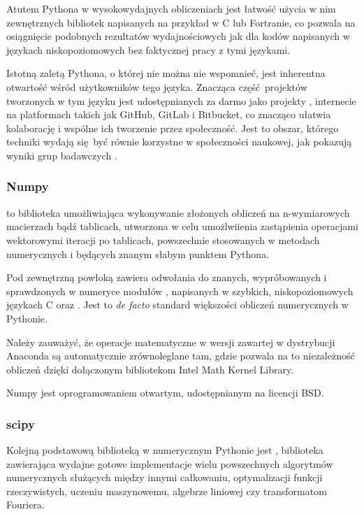     Atutem Pythona w wysokowydajnych obliczeniach jest łatwość użycia w
    nim zewnętrznych bibliotek napisanych na przykład w C lub Fortranie, co
    pozwala na osiągnięcie podobnych rezultatów wydajnościowych jak dla kodów
    napisanych w językach niskopoziomowych bez faktycznej pracy z tymi
    językami.

    Istotną zaletą Pythona, o której nie można nie wspomnieć, jest inherentna
    otwartość wśród użytkowników tego języka. Znacząca część projektów tworzonych w
    tym języku jest udostępnianych za darmo jako projekty ,
    internecie na platformach takich jak GitHub, GitLab i Bitbucket, co znacząco
    ułatwia kolaborację i wspólne ich tworzenie przez społeczność.  Jest to obszar,
    którego techniki wydają się być równie korzystne w społeczności naukowej, jak pokazują
    wyniki grup badawczych \cite{labarba}. %

    \subsubsection{Numpy}
    \cite{numpy} to biblioteka umożliwiająca wykonywanie złożonych obliczeń na
    n-wymiarowych macierzach bądź tablicach, utworzona w celu umożlwiienia
    zastąpienia operacjami wektorowymi iteracji po tablicach, powszechnie
    stosowanych w metodach numerycznych i będących znanym słabym punktem
    Pythona.

    Pod zewnętrzną powłoką zawiera odwołania do znanych, wypróbowanych i
    sprawdzonych w numeryce modułów ,  napisanych w
    szybkich, niskopoziomowych językach C oraz .  Jest to
    \emph{de facto} standard większości obliczeń numerycznych w Pythonie.

    Należy zauważyć, że operacje matematyczne w wersji  zawartej
    w dystrybucji Anaconda są automatycznie
    zrównoleglane tam, gdzie pozwala na to
        niezależność obliczeń dzięki dołączonym bibliotekom Intel Math Kernel Library.\cite{intel-mkl} 

    Numpy jest oprogramowaniem otwartym, udostępnianym na licencji BSD.


    \subsubsection{scipy}
    Kolejną podstawową biblioteką w numerycznym Pythonie jest ,
    biblioteka zawierająca wydajne gotowe implementacje wielu powszechnych algorytmów
    numerycznych służących między innymi całkowaniu, optymalizacji funkcji rzeczywistych,
    uczeniu maszynowemu, algebrze liniowej czy transformatom Fouriera.


